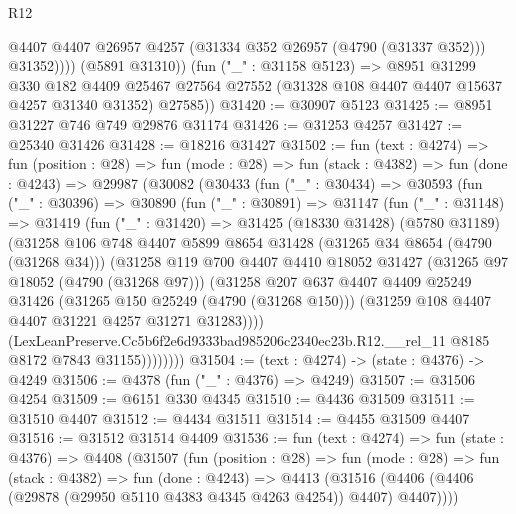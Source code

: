 \begin{lexlean}{R12}
\begin{coremodule}
                @4407
                @4407
                @26957
                @4257
                (@31334 @352 @26957 (@4790 (@31337 @352)))
                @31352))))
        (@5891 @31310))
      (fun ("_" : @31158 @5123) =>
      @8951
        @31299
        @330
        @182
        @4409
        @25467
        @27564
        @27552
        (@31328 @108 @4407 @4407 @15637 @4257 @31340 @31352)
        @27585))
@31420 := @30907 @5123
@31425 := @8951 @31227 @746 @749 @29876 @31174
@31426 := @31253 @4257
@31427 := @25340 @31426
@31428 := @18216 @31427
@31502 := fun (text : @4274) =>
  fun (position : @28) =>
  fun (mode : @28) =>
  fun (stack : @4382) =>
  fun (done : @4243) =>
  @29987
    (@30082
      (@30433
        (fun ("_" : @30434) =>
        @30593
          (fun ("_" : @30396) =>
          @30890
            (fun ("_" : @30891) =>
            @31147
              (fun ("_" : @31148) =>
              @31419
                (fun ("_" : @31420) =>
                @31425
                  (@18330 @31428)
                  (@5780 @31189)
                  (@31258
                    @106
                    @748
                    @4407
                    @5899
                    @8654
                    @31428
                    (@31265 @34 @8654 (@4790 (@31268 @34)))
                    (@31258
                      @119
                      @700
                      @4407
                      @4410
                      @18052
                      @31427
                      (@31265 @97 @18052 (@4790 (@31268 @97)))
                      (@31258
                        @207
                        @637
                        @4407
                        @4409
                        @25249
                        @31426
                        (@31265 @150 @25249 (@4790 (@31268 @150)))
                        (@31259 @108 @4407 @4407 @31221 @4257 @31271 @31283))))
                  (LexLeanPreserve.Cc5b6f2e6d9333bad985206c2340ec23b.R12.__rel_11
                    @8185
                    @8172
                    @7843
                    @31155))))))))
@31504 := (text : @4274) -> (state : @4376) -> @4249
@31506 := @4378 (fun ("_" : @4376) => @4249)
@31507 := @31506 @4254
@31509 := @6151 @330 @4345
@31510 := @4436 @31509
@31511 := @31510 @4407
@31512 := @4434 @31511
@31514 := @4455 @31509 @4407
@31516 := @31512 @31514 @4409
@31536 := fun (text : @4274) =>
  fun (state : @4376) =>
  @4408
    (@31507
      (fun (position : @28) =>
      fun (mode : @28) =>
      fun (stack : @4382) =>
      fun (done : @4243) =>
      @4413 (@31516 (@4406 (@4406 (@29878 (@29950 @5110 @4383 @4345 @4263 @4254)) @4407) @4407))))

\end{coremodule}
\end{lexlean}
